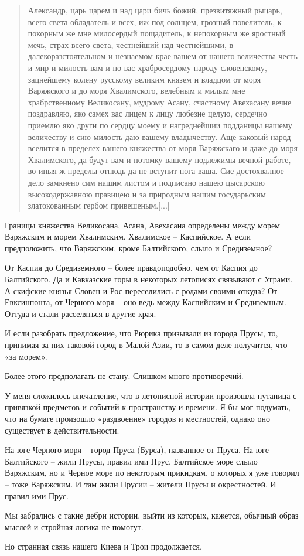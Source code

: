 \begin{quotation}
Александр, царь царем и над цари бичь божий, презвитяжный рыцарь, всего света обладатель и всех, иж под солнцем, грозный повелитель, к покорным же мне милосердый пощадитель, к непокорным же яростный мечь, страх всего света, честнейший над честнейшими, в далекоразстоятельном и незнаемом крае вашем от нашего величества честь и мир и милость вам и по вас храбросердому народу словенскому, зацнейшему колену русскому великим князем и владцом от моря Варяжского и до моря Хвалимского, велебным и милым мне храбрственному Великосану, мудрому Асану, счастному Авехасану вечне поздравляю, яко самех вас лицем к лицу любезне целую, сердечно приемлю яко други по сердцу моему и нагреднейшии подданицы нашему величеству и сию милость даю вашему владычеству. Аще каковый народ вселится в пределех вашего княжества от моря Варяжскаго и даже до моря Хвалимского, да будут вам и потомку вашему подлежимы вечной работе, во иныя ж пределы отнюдь да не вступит нога ваша. Сие достохвалное дело замкнено сим нашим листом и подписано нашею цысарскою высокодержавною правицею и за природным нашим государьским златокованным гербом привешеным.[...]
\end{quotation}

Границы княжества Великосана, Асана, Авехасана определены между морем Варяжским и морем Хвалимским. Хвалимское – Каспийское. А если предположить, что Варяжским, кроме Балтийского, слыло и Средиземное? 

От Каспия до Средиземного – более правдоподобно, чем от Каспия до Балтийского. Да и Кавказские горы в некоторых летописях связывают с Уграми. А скифские князья Словен и Рос переселились с родами своими откуда? От Евксинпонта, от Черного моря – оно ведь между Каспийским и Средиземным. Оттуда и стали расселяться в другие края.

И если разобрать предложение, что Рюрика призывали из города Прусы, то, принимая за них таковой город в Малой Азии, то в самом деле получится, что «за морем».

Более этого предполагать не стану. Слишком много противоречий.

У меня сложилось впечатление, что в летописной истории произошла путаница с привязкой предметов и событий к пространству и времени. Я бы мог подумать, что на бумаге произошло «раздвоение» городов и местностей, однако оно существует в действительности. 

На юге Черного моря – город Пруса (Бурса), названное от Пруса. На юге Балтийского – жили Прусы, правил ими Прус. Балтийское море слыло Варяжским, но и Черное море по некоторым прикидкам, о которых я уже говорил – тоже Варяжским. И там жили Прусии – жители Прусы и окрестностей. И правил ими Прус.

Мы забрались с такие дебри истории, выйти из которых, кажется, обычный образ мыслей и стройная логика не помогут.

Но странная связь нашего Киева и Трои продолжается.
